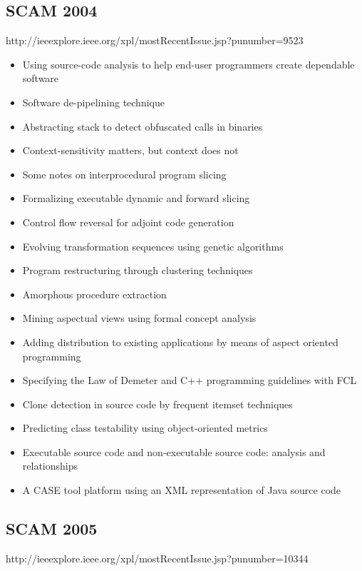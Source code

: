 \subsection{SCAM 2004}

http://ieeexplore.ieee.org/xpl/mostRecentIssue.jsp?punumber=9523

{\small
\begin{itemize}[itemsep=-1ex]
  \item Using source-code analysis to help end-user programmers create dependable software
  \item Software de-pipelining technique
  \item Abstracting stack to detect obfuscated calls in binaries
  \item Context-sensitivity matters, but context does not
  \item Some notes on interprocedural program slicing
  \item Formalizing executable dynamic and forward slicing
  \item Control flow reversal for adjoint code generation
  \item Evolving transformation sequences using genetic algorithms
  \item Program restructuring through clustering techniques
  \item Amorphous procedure extraction
  \item Mining aspectual views using formal concept analysis
  \item Adding distribution to existing applications by means of aspect oriented programming
  \item Specifying the Law of Demeter and C++ programming guidelines with FCL
  \item Clone detection in source code by frequent itemset techniques
  \item Predicting class testability using object-oriented metrics
  \item Executable source code and non-executable source code: analysis and relationships
  \item A CASE tool platform using an XML representation of Java source code
\end{itemize}
}

\subsection{SCAM 2005}

http://ieeexplore.ieee.org/xpl/mostRecentIssue.jsp?punumber=10344

